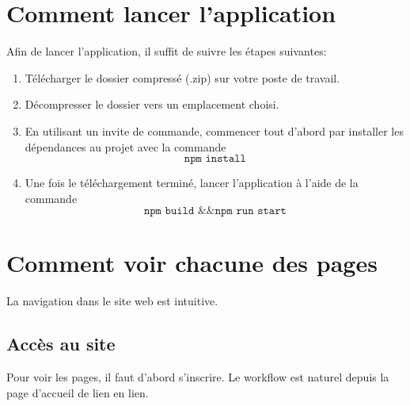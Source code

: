 \documentclass[12pt]{/home/samuel/Documents/GLO/latex/documentClass/GLO_ULAVAL}
\begin{document}
\modifyItemize{}
\maketitle

\chapter*{Comment lancer l'application}
Afin de lancer l'application, il suffit de suivre les étapes suivantes:
\begin{enumerate}
  \item Télécharger le dossier compressé (.zip) sur votre poste de travail.
  \item Décompresser le dossier vers un emplacement choisi.
  \item En utilisant un invite de commande, commencer tout d'abord par installer les dépendances au projet avec la commande
  $$\texttt{npm install}$$
  \item Une fois le téléchargement terminé, lancer l'application à l'aide de la commande
  $$\texttt{npm build \&\& npm run start}$$
\end{enumerate}

\chapter*{Comment voir chacune des pages}
La navigation dans le site web est intuitive. \\

\section*{Accès au site}
Pour voir les pages, il faut d'abord s'inscrire. Le workflow est naturel depuis la page d'accueil de lien en lien.
\end{document}
